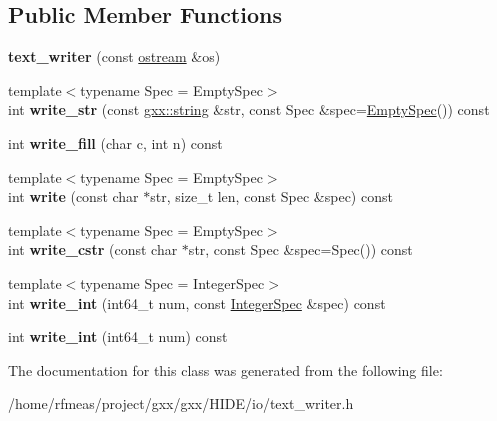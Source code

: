 \subsection*{Public Member Functions}
\begin{DoxyCompactItemize}
\item 
{\bfseries text\+\_\+writer} (const \hyperlink{classgxx_1_1ostream}{ostream} \&os)\hypertarget{classgxx_1_1text__writer_af97ed20f689f57a1505c8eee2455102f}{}\label{classgxx_1_1text__writer_af97ed20f689f57a1505c8eee2455102f}

\item 
{\footnotesize template$<$typename Spec  = Empty\+Spec$>$ }\\int {\bfseries write\+\_\+str} (const \hyperlink{classgxx_1_1basic__string}{gxx\+::string} \&str, const Spec \&spec=\hyperlink{classgxx_1_1EmptySpec}{Empty\+Spec}()) const \hypertarget{classgxx_1_1text__writer_aadd74461e568af8b5b48834f1a8c5323}{}\label{classgxx_1_1text__writer_aadd74461e568af8b5b48834f1a8c5323}

\item 
int {\bfseries write\+\_\+fill} (char c, int n) const \hypertarget{classgxx_1_1text__writer_aa344d318a8c2aca0070d4017cb987adf}{}\label{classgxx_1_1text__writer_aa344d318a8c2aca0070d4017cb987adf}

\item 
{\footnotesize template$<$typename Spec  = Empty\+Spec$>$ }\\int {\bfseries write} (const char $\ast$str, size\+\_\+t len, const Spec \&spec) const \hypertarget{classgxx_1_1text__writer_a6bbfa32a5f91175280599174c932f2c7}{}\label{classgxx_1_1text__writer_a6bbfa32a5f91175280599174c932f2c7}

\item 
{\footnotesize template$<$typename Spec  = Empty\+Spec$>$ }\\int {\bfseries write\+\_\+cstr} (const char $\ast$str, const Spec \&spec=Spec()) const \hypertarget{classgxx_1_1text__writer_a4374a959e770eb9acedc85a569d18d2c}{}\label{classgxx_1_1text__writer_a4374a959e770eb9acedc85a569d18d2c}

\item 
{\footnotesize template$<$typename Spec  = Integer\+Spec$>$ }\\int {\bfseries write\+\_\+int} (int64\+\_\+t num, const \hyperlink{classgxx_1_1IntegerSpec}{Integer\+Spec} \&spec) const \hypertarget{classgxx_1_1text__writer_af548844227528a190ccb6e146850b91b}{}\label{classgxx_1_1text__writer_af548844227528a190ccb6e146850b91b}

\item 
int {\bfseries write\+\_\+int} (int64\+\_\+t num) const \hypertarget{classgxx_1_1text__writer_a481e1f5ffbde61a96bd8b6b18f1fabb0}{}\label{classgxx_1_1text__writer_a481e1f5ffbde61a96bd8b6b18f1fabb0}

\end{DoxyCompactItemize}


The documentation for this class was generated from the following file\+:\begin{DoxyCompactItemize}
\item 
/home/rfmeas/project/gxx/gxx/\+H\+I\+D\+E/io/text\+\_\+writer.\+h\end{DoxyCompactItemize}
